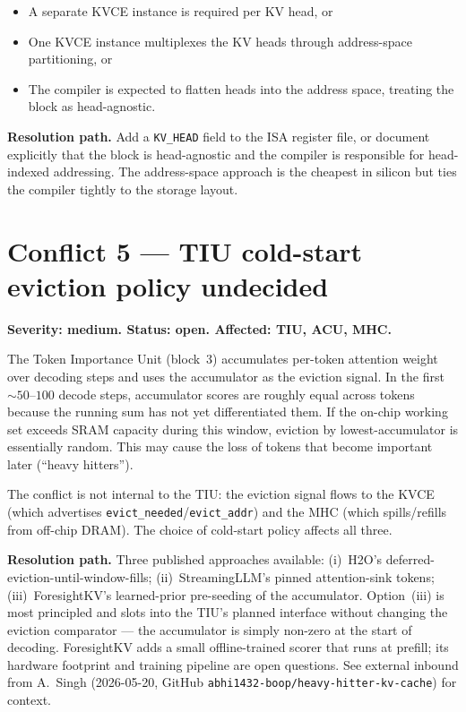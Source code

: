 \documentclass[11pt]{article}
\begin{document}
\begin{itemize}
\item A separate KVCE instance is required per KV head, or
\item One KVCE instance multiplexes the KV heads through
address-space partitioning, or
\item The compiler is expected to flatten heads into the address
space, treating the block as head-agnostic.
\end{itemize}

\textbf{Resolution path.} Add a \texttt{KV\_HEAD} field to the ISA
register file, or document explicitly that the block is
head-agnostic and the compiler is responsible for head-indexed
addressing. The address-space approach is the cheapest in silicon
but ties the compiler tightly to the storage layout.

\section{Conflict 5 --- TIU cold-start eviction policy undecided}
\label{sec:c5}

\textbf{Severity: medium. Status: open. Affected: TIU, ACU, MHC.}

The Token Importance Unit (block~3) accumulates per-token attention
weight over decoding steps and uses the accumulator as the eviction
signal. In the first $\sim 50$--$100$ decode steps, accumulator
scores are roughly equal across tokens because the running sum has
not yet differentiated them. If the on-chip working set exceeds
SRAM capacity during this window, eviction by lowest-accumulator
is essentially random. This may cause the loss of tokens that
become important later (``heavy hitters'').

The conflict is not internal to the TIU: the eviction signal flows
to the KVCE (which advertises \texttt{evict\_needed}/\texttt{evict\_addr})
and the MHC (which spills/refills from off-chip DRAM). The choice
of cold-start policy affects all three.

\textbf{Resolution path.} Three published approaches available:
(i)~H2O's deferred-eviction-until-window-fills; (ii)~StreamingLLM's
pinned attention-sink tokens; (iii)~ForesightKV's learned-prior
pre-seeding of the accumulator. Option~(iii) is most principled and
slots into the TIU's planned interface without changing the
eviction comparator --- the accumulator is simply non-zero at the
start of decoding. ForesightKV adds a small offline-trained scorer
that runs at prefill; its hardware footprint and training pipeline
are open questions. See external inbound from A.~Singh (2026-05-20,
GitHub \texttt{abhi1432-boop/heavy-hitter-kv-cache}) for context.
\end{document}
